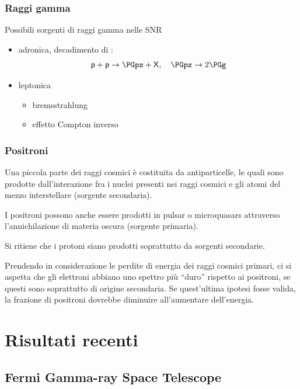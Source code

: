 \documentclass[10pt]{beamer}
\begin{document}
\begin{frame}
  \frametitle{Raggi gamma}
  Possibili sorgenti di raggi gamma nelle SNR
  \begin{itemize}[<+->]
  \item adronica, decadimento di \PGpz:
    \begin{equation*}
      \mathsf{p} + \mathsf{p} \to \PGpz + \mathsf{X}, \quad \PGpz \to 2\PGg
    \end{equation*}
  \item leptonica
    \begin{itemize}
    \item bremsstrahlung
    \item effetto Compton inverso
    \end{itemize}
  \end{itemize}
\end{frame}


\begin{frame}
  \frametitle{Positroni}
  Una piccola parte dei raggi cosmici è costituita da antiparticelle, le quali
  sono prodotte dall'interazione fra i nuclei presenti nei raggi cosmici e gli
  atomi del mezzo interstellare (\alert{sorgente secondaria}).

  I positroni possono anche essere prodotti in pulsar o microquasars attraverso
  l'annichilazione di materia oscura (\alert{sorgente primaria}).

  Si ritiene che i protoni siano
  \alert{prodotti soprattutto da sorgenti secondarie}.

  Prendendo in considerazione le perdite di energia dei raggi cosmici primari,
  ci si aspetta che gli elettroni abbiano uno spettro più ``duro'' rispetto ai
  positroni, se questi sono soprattutto di origine secondaria.  Se quest'ultima
  ipotesi fosse valida,
  \alert{la frazione di positroni dovrebbe diminuire all'aumentare
    dell'energia}.
\end{frame}

\section{Risultati recenti}

\subsection{Fermi Gamma-ray Space Telescope}
\end{document}

